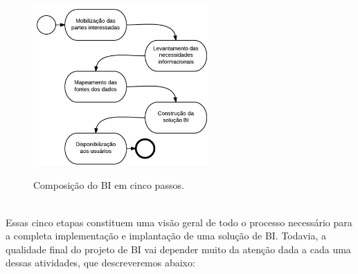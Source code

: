 \begin{figure}[H]
	\vspace*{0,2cm}
    \centering
    \caption{Composição do BI em cinco passos.}
    \includegraphics[width=0.6\textwidth]{./04-figuras/figura-04}
    \label{fig:ilustfig04}
\end{figure}
\vspace*{-0,9cm}
{\raggedright {}}\\


Essas cinco etapas constituem uma vis\~{a}o geral de todo o processo necess\'{a}rio para a completa implementa\c{c}\~{a}o e implanta\c{c}\~{a}o de uma solu\c{c}\~{a}o de BI. Todavia, a qualidade final do projeto de BI vai depender muito da aten\c{c}\~{a}o dada a cada uma dessas atividades, que descreveremos abaixo:

